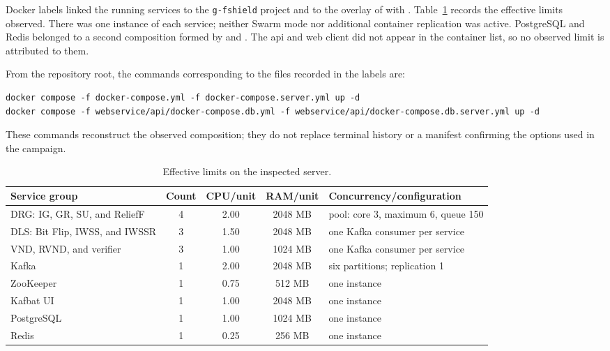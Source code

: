 Docker labels linked the running services to the \texttt{g-fshield} project and to the overlay of  with . Table~\ref{tab:server-container-resources} records the effective limits observed. There was one instance of each service; neither Swarm mode nor additional container replication was active. PostgreSQL and Redis belonged to a second composition formed by  and . The \ac{api} and web client did not appear in the container list, so no observed limit is attributed to them.

From the repository root, the commands corresponding to the files recorded in the labels are:
\begin{lstlisting}[basicstyle=\ttfamily\footnotesize,breaklines=true,columns=fullflexible]
docker compose -f docker-compose.yml -f docker-compose.server.yml up -d
docker compose -f webservice/api/docker-compose.db.yml -f webservice/api/docker-compose.db.server.yml up -d
\end{lstlisting}
These commands reconstruct the observed composition; they do not replace terminal history or a manifest confirming the options used in the campaign.

\begin{table}[!htb]
  \centering
  \scriptsize
  \caption{Effective limits on the inspected server.}
  \label{tab:server-container-resources}
  \begin{tabularx}{\linewidth}{@{}Xc c c X@{}}
    \toprule
    \textbf{Service group} & \textbf{Count} & \textbf{CPU/unit} & \textbf{RAM/unit} & \textbf{Concurrency/configuration} \\
    \midrule
    DRG: IG, GR, SU, and ReliefF & 4 & 2.00 & 2048 MB & pool: core 3, maximum 6, queue 150 \\
    DLS: Bit Flip, IWSS, and IWSSR & 3 & 1.50 & 2048 MB & one Kafka consumer per service \\
    VND, RVND, and verifier & 3 & 1.00 & 1024 MB & one Kafka consumer per service \\
    Kafka & 1 & 2.00 & 2048 MB & six partitions; replication 1 \\
    ZooKeeper & 1 & 0.75 & 512 MB & one instance \\
    Kafbat UI & 1 & 1.00 & 2048 MB & one instance \\
    PostgreSQL & 1 & 1.00 & 1024 MB & one instance \\
    Redis & 1 & 0.25 & 256 MB & one instance \\
    \bottomrule
  \end{tabularx}
\end{table}

